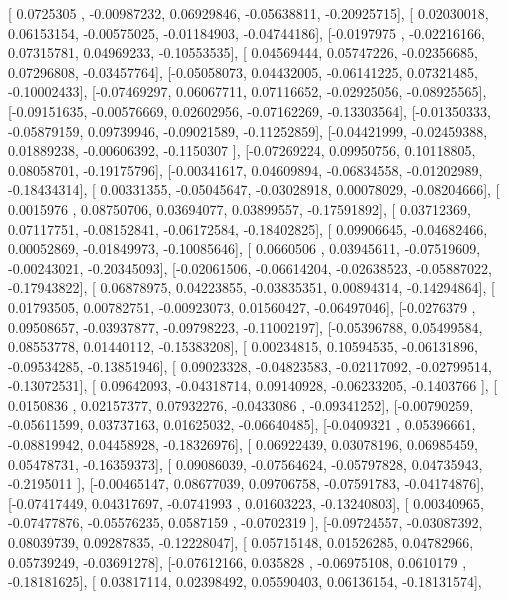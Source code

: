\documentclass{article}
\begin{document}
       [ 0.0725305 , -0.00987232,  0.06929846, -0.05638811, -0.20925715],
       [ 0.02030018,  0.06153154, -0.00575025, -0.01184903, -0.04744186],
       [-0.0197975 , -0.02216166,  0.07315781,  0.04969233, -0.10553535],
       [ 0.04569444,  0.05747226, -0.02356685,  0.07296808, -0.03457764],
       [-0.05058073,  0.04432005, -0.06141225,  0.07321485, -0.10002433],
       [-0.07469297,  0.06067711,  0.07116652, -0.02925056, -0.08925565],
       [-0.09151635, -0.00576669,  0.02602956, -0.07162269, -0.13303564],
       [-0.01350333, -0.05879159,  0.09739946, -0.09021589, -0.11252859],
       [-0.04421999, -0.02459388,  0.01889238, -0.00606392, -0.1150307 ],
       [-0.07269224,  0.09950756,  0.10118805,  0.08058701, -0.19175796],
       [-0.00341617,  0.04609894, -0.06834558, -0.01202989, -0.18434314],
       [ 0.00331355, -0.05045647, -0.03028918,  0.00078029, -0.08204666],
       [ 0.0015976 ,  0.08750706,  0.03694077,  0.03899557, -0.17591892],
       [ 0.03712369,  0.07117751, -0.08152841, -0.06172584, -0.18402825],
       [ 0.09906645, -0.04682466,  0.00052869, -0.01849973, -0.10085646],
       [ 0.0660506 ,  0.03945611, -0.07519609, -0.00243021, -0.20345093],
       [-0.02061506, -0.06614204, -0.02638523, -0.05887022, -0.17943822],
       [ 0.06878975,  0.04223855, -0.03835351,  0.00894314, -0.14294864],
       [ 0.01793505,  0.00782751, -0.00923073,  0.01560427, -0.06497046],
       [-0.0276379 ,  0.09508657, -0.03937877, -0.09798223, -0.11002197],
       [-0.05396788,  0.05499584,  0.08553778,  0.01440112, -0.15383208],
       [ 0.00234815,  0.10594535, -0.06131896, -0.09534285, -0.13851946],
       [ 0.09023328, -0.04823583, -0.02117092, -0.02799514, -0.13072531],
       [ 0.09642093, -0.04318714,  0.09140928, -0.06233205, -0.1403766 ],
       [ 0.0150836 ,  0.02157377,  0.07932276, -0.0433086 , -0.09341252],
       [-0.00790259, -0.05611599,  0.03737163,  0.01625032, -0.06640485],
       [-0.0409321 ,  0.05396661, -0.08819942,  0.04458928, -0.18326976],
       [ 0.06922439,  0.03078196,  0.06985459,  0.05478731, -0.16359373],
       [ 0.09086039, -0.07564624, -0.05797828,  0.04735943, -0.2195011 ],
       [-0.00465147,  0.08677039,  0.09706758, -0.07591783, -0.04174876],
       [-0.07417449,  0.04317697, -0.0741993 ,  0.01603223, -0.13240803],
       [ 0.00340965, -0.07477876, -0.05576235,  0.0587159 , -0.0702319 ],
       [-0.09724557, -0.03087392,  0.08039739,  0.09287835, -0.12228047],
       [ 0.05715148,  0.01526285,  0.04782966,  0.05739249, -0.03691278],
       [-0.07612166,  0.035828  , -0.06975108,  0.0610179 , -0.18181625],
       [ 0.03817114,  0.02398492,  0.05590403,  0.06136154, -0.18131574],
\end{document}

